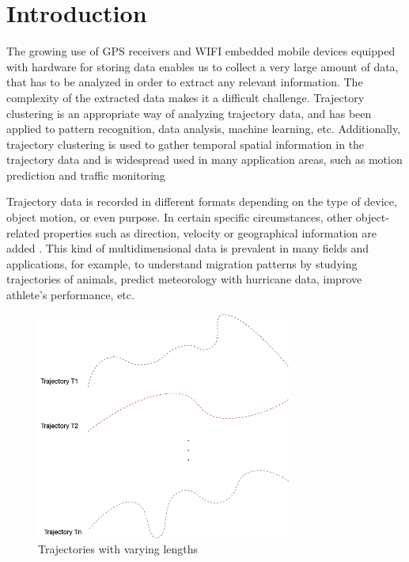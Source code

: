 \documentclass[a4paper, 12pt]{article}
\begin{document}



\tableofcontents

\listoffigures

\listofmyequations

\cleardoublepage


\section{Introduction}
The growing use of GPS receivers and WIFI embedded mobile devices equipped with hardware for storing data enables us to collect a very large amount of data, that has to be analyzed in order to extract any relevant information. The complexity of the extracted data makes it a difficult challenge. Trajectory clustering is an appropriate way of analyzing trajectory data, and has been applied to pattern recognition, data analysis, machine learning, etc. Additionally, trajectory clustering is used to gather temporal spatial information in the trajectory data and is widespread used in many application areas, such as motion prediction \citep{chen2010searching} and traffic monitoring \citep{atev2006learning}

Trajectory data is recorded in different formats depending on the type of device, object motion, or even purpose. In certain specific circumstances, other object-related properties such as direction, velocity or geographical information are added \citep{ying2011semantic,ying2010mining}. This kind of multidimensional data is prevalent in many fields and applications, for example, to understand migration patterns by studying trajectories of animals, predict meteorology with hurricane data, improve athlete’s performance, etc. 

\begin{figure}[ht]
    \centering
    \includegraphics[width=0.75\textwidth]{Trajectories.png}
    \caption{Trajectories with varying lengths}
    \label{fig1}
\end{figure}
\end{document}
